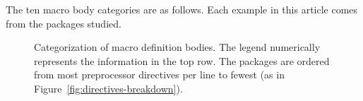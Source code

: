 \documentclass[10pt]{article}
\def\typeofdocument{article}    %
\newcommand{\captionsmall}[1]{\caption[]{\small #1}}
\begin{document}
The ten macro body categories are as follows.  Each example in this 
{\typeofdocument} comes from the packages studied.



\begin{figure}
\centerline{}
\captionsmall{Categorization of macro definition bodies.  The legend numerically
  represents the information in the top row.  The packages are ordered from
  most preprocessor directives per line to fewest (as in
  Figure~\ref{fig:directives-breakdown}).}
\label{fig:categorization}
\end{figure}



\label{sec:categorization-details}
\end{document}
